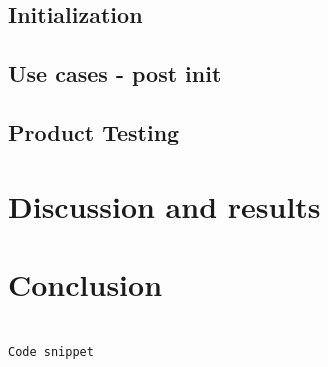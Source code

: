 \documentclass[conference]{IEEEtran}
\begin{document}
\subsection{Initialization}

\subsection{Use cases - post init}

\subsection{Product Testing}

\section{Discussion and results}

\section{Conclusion}






\begin{lstlisting}[basicstyle=\tiny,language=python,caption={Code}]

Code snippet
\end{lstlisting}

\printbibliography
\end{document}
